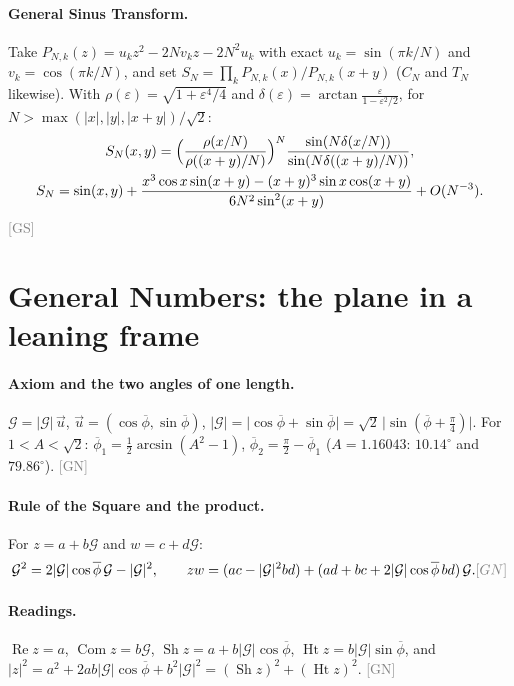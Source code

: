 \documentclass[11pt]{article}
\newcommand{\pb}{\overline{\phi}}
\newcommand{\Gp}{\mathcal{G}}
\newcommand{\G}{\lvert\Gp\rvert}
\renewcommand{\Re}{\operatorname{Re}}
\DeclareMathOperator{\Com}{Com}
\DeclareMathOperator{\Sh}{Sh}
\DeclareMathOperator{\Ht}{Ht}
\newcommand{\src}[1]{\hfill{\small\textcolor{gray}{[#1]}}}
\begin{document}
\paragraph{General Sinus Transform.} Take $P_{N,k}(z) = u_k z^2 - 2Nv_kz - 2N^2u_k$ with exact $u_k = \sin(\pi k/N)$ and $v_k = \cos(\pi k/N)$, and set $S_N = \prod_k P_{N,k}(x)/P_{N,k}(x+y)$ ($C_N$ and $T_N$ likewise). With $\rho(\varepsilon) = \sqrt{1+\varepsilon^4/4}$ and $\delta(\varepsilon) = \arctan\frac{\varepsilon}{1-\varepsilon^2/2}$, for $N > \max(|x|,|y|,|x+y|)/\sqrt2$:
\begin{gather*}
S_N(x,y) = \Bigl(\frac{\rho(x/N)}{\rho((x+y)/N)}\Bigr)^N\frac{\sin(N\delta(x/N))}{\sin(N\delta((x+y)/N))},\\
S_N = \sin(x,y) + \frac{x^3\cos x\sin(x+y) - (x+y)^3\sin x\cos(x+y)}{6N^2\sin^2(x+y)} + O(N^{-3}).
\end{gather*}\src{GS}

\section{General Numbers: the plane in a leaning frame}

\paragraph{Axiom and the two angles of one length.}
$\Gp = \G\,\vec u$, $\vec u = (\cos\pb,\sin\pb)$, $\G = \lvert\cos\pb+\sin\pb\rvert = \sqrt2\,\lvert\sin(\pb+\tfrac\pi4)\rvert$.
For $1<A<\sqrt2$: $\pb_1 = \tfrac12\arcsin(A^2-1)$, $\pb_2 = \tfrac\pi2-\pb_1$ ($A = 1.16043$: $10.14^\circ$ and $79.86^\circ$). \src{GN}

\paragraph{Rule of the Square and the product.} For $z = a+b\Gp$ and $w = c+d\Gp$:
\[
\Gp^2 = 2\G\cos\pb\,\Gp - \G^2,\qquad
zw = (ac - \G^2bd) + (ad+bc+2\G\cos\pb\,bd)\,\Gp .
\src{GN}
\]

\paragraph{Readings.}
$\Re z = a$, $\Com z = b\Gp$, $\Sh z = a + b\G\cos\pb$, $\Ht z = b\G\sin\pb$, and
$\lvert z\rvert^2 = a^2+2ab\G\cos\pb+b^2\G^2 = (\Sh z)^2+(\Ht z)^2$. \src{GN}
\end{document}
